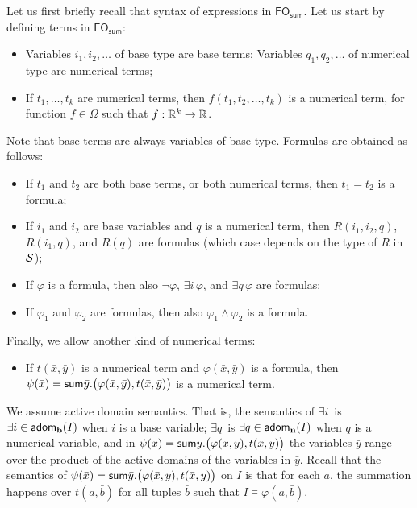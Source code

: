 Let us first briefly recall that syntax of expressions in $\textsf{FO}_{\textsf{sum}}$. Let us start by defining terms in $\textsf{FO}_{\textsf{sum}}$:
\begin{itemize}
\item Variables $i_1,i_2,\ldots$ of base type are base terms; Variables $q_1,q_2,\ldots$ of numerical type are numerical terms;
\item If $t_1,\ldots,t_k$ are numerical terms, then  $f(t_1,t_2,\ldots, t_k)$ is a  numerical term,  for function $f\in\Omega$ such that $f:\mathbb{R}^k\to \mathbb{R}$.
\end{itemize}
Note that base terms are always variables of base type. Formulas are obtained as follows:
\begin{itemize}
\item If $t_1$ and $t_2$ are both base terms, or both numerical terms, then $t_1=t_2$ is a formula;
\item If $i_1$ and $i_2$ are base variables and $q$ is a numerical term, then $R(i_1,i_2,q)$, $R(i_1,q)$, and $R(q)$ are formulas (which case depends on the type of $R$ in $\mathcal{S}$);
\item If $\varphi$ is a formula, then also $\neg \varphi$, $\exists i\, \varphi$, and $\exists q\,\varphi$ are formulas;
\item If $\varphi_1$ and $\varphi_2$ are formulas, then also $\varphi_1\land\varphi_2$ is a formula.  
\end{itemize}
Finally, we allow another kind of numerical terms:
\begin{itemize}
\item If $t(\bar x,\bar y)$ is a numerical term and $\varphi(\bar x,\bar y)$ is a formula, then $\psi(\bar x)=\mathsf{sum} \bar y. \bigl(\varphi(\bar x,\bar y), t(\bar x,\bar y)\bigr)$ is a numerical term.
\end{itemize}

We assume active domain semantics. That is, the semantics of $\exists i\, $ is $\exists i \in \textsf{adom}_{\mathbf{b}}(I)$ when $i$ is a base variable;
$\exists q\, $ is $\exists q \in  \textsf{adom}_{\mathbf{n}}(I)$ when $q$ is a numerical variable, and in  $\psi(\bar x)=\mathsf{sum} \bar y. \bigl(\varphi(\bar x,\bar y), t(\bar x,\bar y)\bigr)$ the
variables $\bar y$ range over the product of the active domains of the variables in $\bar y$. Recall that the semantics of $\psi(\bar x)=\mathsf{sum} \bar y .\bigl(\varphi(\bar x,y), t(\bar x,y)\bigr)$ on
$I$ is that for each $\bar a$, the summation happens over $t(\bar a,\bar b)$ for all tuples $\bar b$ such that $I\models\varphi(\bar a,\bar b)$. 

